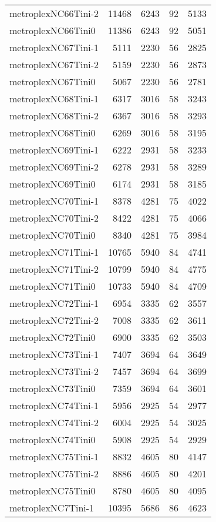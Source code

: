 \begin{longtable}{lrrrr}
metroplexNC66Tini-2 & 11468 & 6243 & 92 & 5133 \\
metroplexNC66Tini0 & 11386 & 6243 & 92 & 5051 \\
metroplexNC67Tini-1 & 5111 & 2230 & 56 & 2825 \\
metroplexNC67Tini-2 & 5159 & 2230 & 56 & 2873 \\
metroplexNC67Tini0 & 5067 & 2230 & 56 & 2781 \\
metroplexNC68Tini-1 & 6317 & 3016 & 58 & 3243 \\
metroplexNC68Tini-2 & 6367 & 3016 & 58 & 3293 \\
metroplexNC68Tini0 & 6269 & 3016 & 58 & 3195 \\
metroplexNC69Tini-1 & 6222 & 2931 & 58 & 3233 \\
metroplexNC69Tini-2 & 6278 & 2931 & 58 & 3289 \\
metroplexNC69Tini0 & 6174 & 2931 & 58 & 3185 \\
metroplexNC70Tini-1 & 8378 & 4281 & 75 & 4022 \\
metroplexNC70Tini-2 & 8422 & 4281 & 75 & 4066 \\
metroplexNC70Tini0 & 8340 & 4281 & 75 & 3984 \\
metroplexNC71Tini-1 & 10765 & 5940 & 84 & 4741 \\
metroplexNC71Tini-2 & 10799 & 5940 & 84 & 4775 \\
metroplexNC71Tini0 & 10733 & 5940 & 84 & 4709 \\
metroplexNC72Tini-1 & 6954 & 3335 & 62 & 3557 \\
metroplexNC72Tini-2 & 7008 & 3335 & 62 & 3611 \\
metroplexNC72Tini0 & 6900 & 3335 & 62 & 3503 \\
metroplexNC73Tini-1 & 7407 & 3694 & 64 & 3649 \\
metroplexNC73Tini-2 & 7457 & 3694 & 64 & 3699 \\
metroplexNC73Tini0 & 7359 & 3694 & 64 & 3601 \\
metroplexNC74Tini-1 & 5956 & 2925 & 54 & 2977 \\
metroplexNC74Tini-2 & 6004 & 2925 & 54 & 3025 \\
metroplexNC74Tini0 & 5908 & 2925 & 54 & 2929 \\
metroplexNC75Tini-1 & 8832 & 4605 & 80 & 4147 \\
metroplexNC75Tini-2 & 8886 & 4605 & 80 & 4201 \\
metroplexNC75Tini0 & 8780 & 4605 & 80 & 4095 \\
metroplexNC7Tini-1 & 10395 & 5686 & 86 & 4623 \\

\end{longtable}
